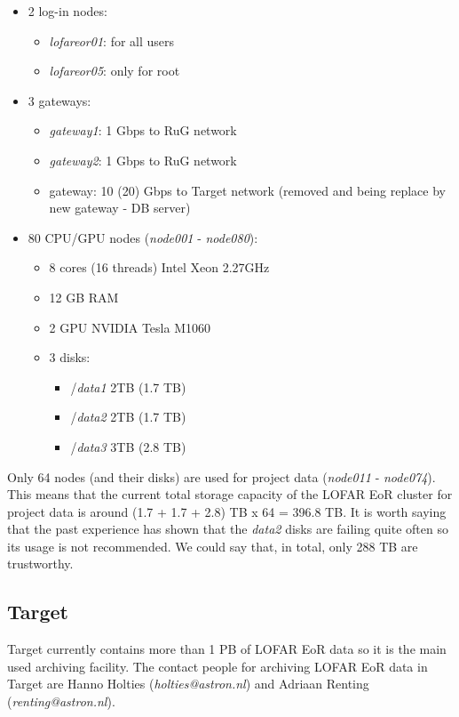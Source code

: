 \documentclass[a4paper,11pt]{article}
\begin{document}
\begin{itemize}
	\item 2 log-in nodes:
	\begin{itemize}
		\item \textit{lofareor01}: for all users
		\item \textit{lofareor05}: only for root
	\end{itemize}
	\item 3 gateways:
	\begin{itemize}
		\item \textit{gateway1}: 1 Gbps to RuG network
		\item \textit{gateway2}: 1 Gbps to RuG network
		\item gateway: 10 (20) Gbps to Target network (removed and being replace by new gateway - DB server)
	\end{itemize}
	\item 80 CPU/GPU nodes (\textit{node001} - \textit{node080}):
	\begin{itemize}
		\item 8 cores (16 threads) Intel Xeon 2.27GHz
		\item 12 GB RAM
		\item 2 GPU NVIDIA Tesla M1060 
		\item 3 disks: 
			\begin{itemize}
				\item /\textit{data1} 2TB (1.7 TB)
				\item /\textit{data2} 2TB (1.7 TB)
				\item /\textit{data3} 3TB (2.8 TB)
			\end{itemize}
	\end{itemize}
\end{itemize}

Only 64 nodes (and their disks) are used for project data (\textit{node011} - \textit{node074}). This means that the current total storage capacity of the LOFAR EoR cluster for project data is around (1.7 + 1.7 + 2.8) TB x 64 = 396.8 TB. It is worth saying that the past experience has shown that the \textit{data2} disks are failing quite often so its usage is not recommended. We could say that, in total, only 288 TB are trustworthy.

\subsection{Target}

Target currently contains more than 1 PB of LOFAR EoR data so it is the main used archiving facility. The contact people for archiving LOFAR EoR data in Target are Hanno Holties (\textit{holties@astron.nl}) and Adriaan Renting (\textit{renting@astron.nl}).
\end{document}
